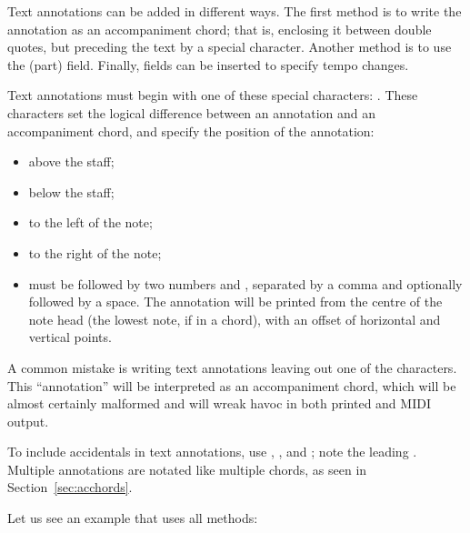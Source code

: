 \documentclass[a4paper,12pt]{book}
\begin{document}
Text annotations can be added in different ways. The first method is
to write the annotation as an accompaniment chord; that is, enclosing
it between double quotes, but preceding the text by a special
character. Another method is to use the  (part) field.
Finally,  fields can be inserted to specify tempo changes.

Text annotations must begin with one of these special characters:
. These characters set the logical
difference between an annotation and an accompaniment chord, and
specify the position of the annotation:

\begin{itemize}

  \item \car{\textasciicircum} above the staff;
  
  \item \car{\_} below the staff;
  
  \item \car{\textless} to the left of the note;
  
  \item \car{\textgreater} to the right of the note;
  
  \item {} must be followed by two numbers  and ,
  separated by a comma and optionally followed by a space. The
  annotation will be printed from the centre of the note head (the
  lowest note, if in a chord), with an offset of  horizontal
  and  vertical points.
  
\end{itemize}

\begin{vimp}

  A common mistake is writing text annotations leaving out one of the 
   characters. This ``annotation''
  will be interpreted as an accompaniment chord, which will be almost
  certainly malformed and will wreak havoc in both printed and MIDI
  output.

\end{vimp}

To include accidentals in text annotations, use \car{\bl{}\#},
, and \car{\bl{}=}; note the leading \car{\bl{}}. Multiple
annotations are notated like multiple chords, as seen in
Section~\ref{sec:acchords}.

Let us see an example that uses all methods:
\end{document}
